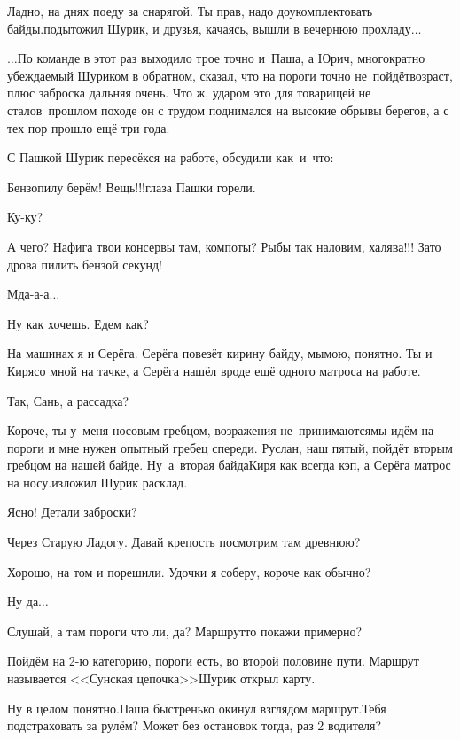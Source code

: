 \diagdash Ладно, на днях поеду за снарягой. Ты прав, надо доукомплектовать байды.\mdash подытожил Шурик, и друзья, качаясь, вышли в вечернюю прохладу$\ldots$

\vspace{0.9cm}

$\ldots$По команде в этот раз выходило трое точно и~Паша, а Юрич, многократно убеждаемый Шуриком в обратном, сказал, что на пороги точно не~пойдёт\mdash возраст, плюс заброска дальняя очень. Что ж, ударом это для товарищей не стало\mdash в~прошлом походе он с трудом поднимался на высокие обрывы берегов, а с тех пор прошло ещё три года.

С Пашкой Шурик пересёкся на работе, обсудили как~и~что:

\diagdash Бензопилу берём! Вещь!!!\mdash глаза Пашки горели.

\diagdash Ку-ку?

\diagdash А чего? Нафига твои консервы там, компоты? Рыбы так наловим, халява!!! Зато дрова пилить бензой секунд!

\diagdash Мда-а-а$\ldots$

\diagdash Ну как хочешь. Едем как?

\diagdash На машинах я и Серёга. Серёга повезёт кирину байду, мы\mdash мою, понятно. Ты и Киря\mdash со мной на тачке, а Серёга нашёл вроде ещё одного матроса на работе.

\diagdash Так, Сань, а рассадка?

\diagdash Короче, ты у~меня носовым гребцом, возражения не~принимаются\mdash мы идём на пороги и мне нужен опытный гребец спереди. Руслан, наш пятый, пойдёт вторым гребцом на нашей байде. Ну~а~вторая байда\mdash Киря как всегда кэп, а Серёга матрос на носу.\mdash изложил Шурик расклад.

\diagdash Ясно! Детали заброски?

\diagdash Через Старую Ладогу. Давай крепость посмотрим там древнюю?

\diagdash Хорошо, на том и порешили. Удочки я соберу, короче как обычно?

\diagdash Ну да$\ldots$

\diagdash Слушай, а там пороги что ли, да? Маршрут\sdash то покажи примерно?

\diagdash Пойдём на 2-ю категорию, пороги есть, во второй половине пути. Маршрут называется <<Сунская цепочка>>\mdash Шурик открыл карту.

\diagdash Ну в целом понятно.\mdash Паша быстренько окинул взглядом маршрут.\mdash Тебя подстраховать за рулём? Может без остановок тогда, раз 2 водителя?

